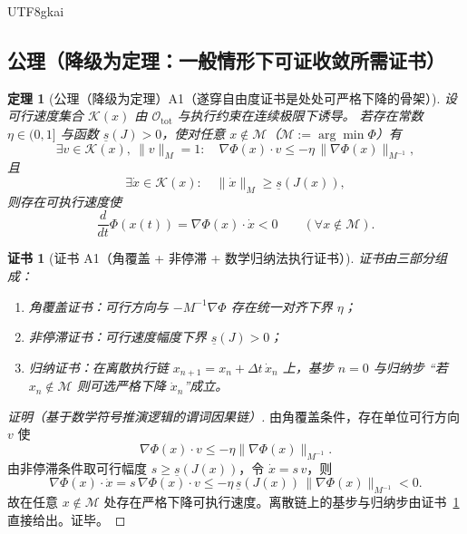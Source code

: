 \documentclass[12pt]{article}
\newtheorem{theorem}{定理}[section]
\newtheorem{Certificate}{证书}[section]
\begin{document}
\begin{CJK*}{UTF8}{gkai}
\subsection{公理（降级为定理：一般情形下可证收敛所需证书）}
\label{subsec:tex28-ch14-axioms}

\begin{theorem}[公理（降级为定理）A1（遂穿自由度证书是处处可严格下降的骨架）]
\label{thm:tex28-ch14-a1}
设可行速度集合 $\mathcal K(x)$ 由 $\mathcal O_{\mathrm{tot}}$ 与执行约束在连续极限下诱导。
若存在常数 $\eta\in(0,1]$ 与函数 $\underline s(J)>0$，使对任意 $x\notin\mathcal M$（$\mathcal M:=\arg\min\Phi$）有
\[
  \exists v\in\mathcal K(x),\ \|v\|_M=1:
  \quad
  \nabla\Phi(x)\cdot v
  \le
  -\eta\,\|\nabla\Phi(x)\|_{M^{-1}},
\]
且
\[
  \exists \dot x\in\mathcal K(x):
  \quad
  \|\dot x\|_M\ge \underline s(J(x)),
\]
则存在可执行速度使
\[
  \frac{d}{dt}\Phi(x(t))
  =
  \nabla\Phi(x)\cdot\dot x
  <0
  \qquad
  (\forall x\notin\mathcal M).
\]
\end{theorem}

\begin{Certificate}[证书 A1（角覆盖 + 非停滞 + 数学归纳法执行证书）]
\label{cert:tex28-ch14-a1}
证书由三部分组成：
\begin{enumerate}
  \item 角覆盖证书：可行方向与 $-M^{-1}\nabla\Phi$ 存在统一对齐下界 $\eta$；
  \item 非停滞证书：可行速度幅度下界 $\underline s(J)>0$；
  \item 归纳证书：在离散执行链 $x_{n+1}=x_n+\Delta t\,\dot x_n$ 上，基步 $n=0$ 与归纳步
  “若 $x_n\notin\mathcal M$ 则可选严格下降 $\dot x_n$”成立。
\end{enumerate}
\end{Certificate}

\begin{proof}[证明（基于数学符号推演逻辑的谓词因果链）]
由角覆盖条件，存在单位可行方向 $v$ 使
\[
  \nabla\Phi(x)\cdot v\le -\eta\|\nabla\Phi(x)\|_{M^{-1}}.
\]
由非停滞条件取可行幅度 $s\ge \underline s(J(x))$，令 $\dot x=s\,v$，则
\[
  \nabla\Phi(x)\cdot\dot x
  =
  s\,\nabla\Phi(x)\cdot v
  \le
  -\eta\,\underline s(J(x))\,\|\nabla\Phi(x)\|_{M^{-1}}<0.
\]
故在任意 $x\notin\mathcal M$ 处存在严格下降可执行速度。离散链上的基步与归纳步由证书~\ref{cert:tex28-ch14-a1} 直接给出。证毕。
\end{proof}


\end{CJK*}
\end{document}

